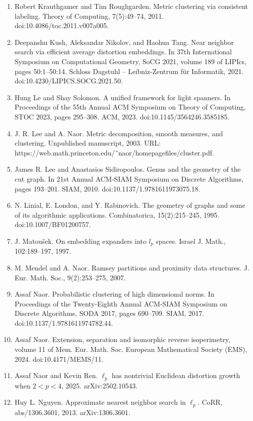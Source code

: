 \begin{enumerate}
\item  [32]  Robert Krauthgamer and Tim Roughgarden.  Metric clustering via consistent labeling.  Theory of Computing, 7(5):49–74, 2011.  doi:10.4086/toc.2011.v007a005.  
\item  [33]  Deepanshu Kush, Aleksandar Nikolov, and Haohua Tang.  Near neighbor search via efficient average distortion embeddings.  In 37th International Symposium on Computational Geometry, SoCG 2021, volume 189 of LIPIcs, pages 50:1–50:14. Schloss Dagstuhl – Leibniz-Zentrum für Informatik, 2021.  doi:10.4230/LIPICS.SOCG.2021.50.  
\item  [34]  Hung Le and Shay Solomon.  A unified framework for light spanners.  In Proceedings of the 55th Annual ACM Symposium on Theory of Computing, STOC 2023, pages 295–308. ACM, 2023.  doi:10.1145/3564246.3585185.  
\item  [35]  J. R. Lee and A. Naor.  Metric decomposition, smooth measures, and clustering.  Unpublished manuscript, 2003.  URL: https://web.math.princeton.edu/˜naor/homepagefiles/cluster.pdf.  
\item  [36]  James R. Lee and Anastasios Sidiropoulos.  Genus and the geometry of the cut graph.  In 21st Annual ACM-SIAM Symposium on Discrete Algorithms, pages 193–201. SIAM, 2010.  doi:10.1137/1.9781611973075.18.  
\item  [37]  N. Linial, E. London, and Y. Rabinovich.  The geometry of graphs and some of its algorithmic applications.  Combinatorica, 15(2):215–245, 1995.  doi:10.1007/BF01200757.  
\item  [38]  J. Matoušek.  On embedding expanders into $l_{p}$ spaces.  Israel J. Math., 102:189–197, 1997.  
\item  [39]  M. Mendel and A. Naor.  Ramsey partitions and proximity data structures.  J. Eur. Math. Soc., 9(2):253–275, 2007.  
\item  [40]  Assaf Naor.  Probabilistic clustering of high dimensional norms.  In Proceedings of the Twenty-Eighth Annual ACM-SIAM Symposium on Discrete Algorithms, SODA 2017, pages 690–709. SIAM, 2017.  doi:10.1137/1.9781611974782.44.  
\item  [41]  Assaf Naor.  Extension, separation and isomorphic reverse isoperimetry, volume 11 of Mem. Eur. Math. Soc.  European Mathematical Society (EMS), 2024.  doi:10.4171/MEMS/11.  
\item  [42]  Assaf Naor and Kevin Ren.  $\ell_{p}$ has nontrivial Euclidean distortion growth when $2<p<4$, 2025.  arXiv:2502.10543.  
\item  [43]  Huy L. Nguyen.  Approximate nearest neighbor search in $\ell_{p}$.  CoRR, abs/1306.3601, 2013.  arXiv:1306.3601.  

\end{enumerate}
